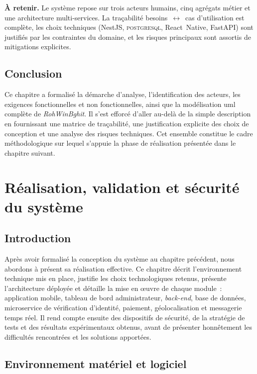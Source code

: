 \documentclass[12pt, a4paper, oneside]{report}
\begin{document}
\begin{highlight}
\textbf{À retenir.} Le système repose sur trois acteurs humains, cinq agrégats métier et une architecture multi-services. La traçabilité besoins~$\leftrightarrow$~cas d'utilisation est complète, les choix techniques (NestJS, \textsc{postgresql}, React~Native, FastAPI) sont justifiés par les contraintes du domaine, et les risques principaux sont assortis de mitigations explicites.
\end{highlight}

\section*{Conclusion}

Ce chapitre a formalisé la démarche d'analyse, l'identification des acteurs, les exigences fonctionnelles et non fonctionnelles, ainsi que la modélisation \gls{uml} complète de \textit{RohWinBghit}. Il s'est efforcé d'aller au-delà de la simple description en fournissant une matrice de traçabilité, une justification explicite des choix de conception et une analyse des risques techniques. Cet ensemble constitue le cadre méthodologique sur lequel s'appuie la phase de réalisation présentée dans le chapitre suivant.


\chapter{Réalisation, validation et sécurité du système}
\label{chap:realisation}

\section*{Introduction}

Après avoir formalisé la conception du système au chapitre précédent, nous abordons à présent sa réalisation effective. Ce chapitre décrit l'environnement technique mis en place, justifie les choix technologiques retenus, présente l'architecture déployée et détaille la mise en œuvre de chaque module~: application mobile, tableau de bord administrateur, \textit{back-end}, base de données, microservice de vérification d'identité, paiement, géolocalisation et messagerie temps réel. Il rend compte ensuite des dispositifs de sécurité, de la stratégie de tests et des résultats expérimentaux obtenus, avant de présenter honnêtement les difficultés rencontrées et les solutions apportées.

\section{Environnement matériel et logiciel}
\label{sec:env-matlog}
\end{document}

